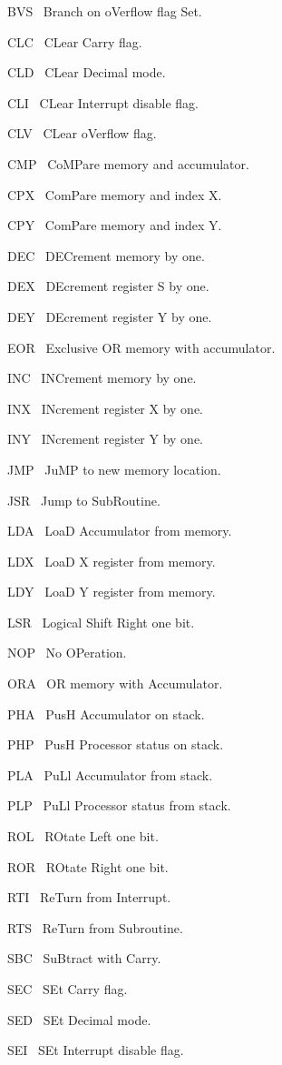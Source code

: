 \documentclass[12pt,twoside]{book}
\begin{document}
BVS \ Branch on oVerflow flag Set.

CLC \ CLear Carry flag.

CLD \ CLear Decimal mode.

CLI \ CLear Interrupt disable flag.

CLV \ CLear oVerflow flag.

CMP \ CoMPare memory and accumulator.

CPX \ ComPare memory and index X.

CPY \ ComPare memory and index Y.

DEC \ DECrement memory by one.

DEX \ DEcrement register S by one.

DEY \ DEcrement register Y by one.

EOR \ Exclusive OR memory with accumulator.

INC \ INCrement memory by one.

INX \ INcrement register X by one.

INY \ INcrement register Y by one.

JMP \ JuMP to new memory location.

JSR \ Jump to SubRoutine.

LDA \ LoaD Accumulator from memory.

LDX \ LoaD X register from memory.

LDY \ LoaD Y register from memory.

LSR \ Logical Shift Right one bit.

NOP \ No OPeration.

ORA \ OR memory with Accumulator.

PHA \ PusH Accumulator on stack.

PHP \ PusH Processor status on stack.

PLA \ PuLl Accumulator from stack.

PLP \ PuLl Processor status from stack.

ROL \ ROtate Left one bit.

ROR \ ROtate Right one bit.

RTI \ ReTurn from Interrupt.

RTS \ ReTurn from Subroutine.

SBC \ SuBtract with Carry.

SEC \ SEt Carry flag.

SED \ SEt Decimal mode.

SEI \ SEt Interrupt disable flag.
\ \ \ \ \ \ \ \ \ \ \ \ \ \ \ \ \ \ \ \ \ \ \ \ \ \ \ \ \ \ \ \ \ \ \ \ \ \ \ 
\end{document}
